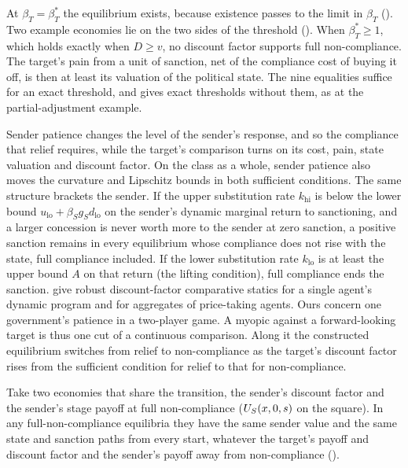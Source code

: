  At
$\beta_T=\beta_T^*$ the equilibrium exists,
because existence passes to the limit in $\beta_T$
(). Two example economies lie on the two sides
of the threshold (). When
$\beta_T^*\ge1$, which holds exactly when $D\ge v$, no discount factor
supports full non-compliance. The target's pain from a unit of sanction, net of the
compliance cost of buying it off, is then at least its valuation of the political
state. The nine
equalities suffice for an exact threshold, and 
gives exact thresholds without them, as at the partial-adjustment example.

 Sender patience changes the level of the sender's response, and so
the compliance that relief requires, while the target's comparison turns on its
cost, pain, state valuation and discount factor.
On the class as a whole, sender patience also moves the curvature and Lipschitz
bounds in both sufficient conditions. The same structure brackets the sender. If the
upper substitution rate $k_{\mathrm{hi}}$ is below the lower bound
$u_{\mathrm{lo}}+\beta_Sg_Sd_{\mathrm{lo}}$ on the sender's dynamic marginal
return to sanctioning, and a larger concession is never worth more to the sender
at zero sanction, a positive sanction remains in every equilibrium whose
compliance does not rise with the state, full compliance included. If the lower
substitution rate $k_{\mathrm{lo}}$ is at least the upper bound $A$ on that return
(the lifting condition), full compliance ends the sanction.
\citet[Lemma~2, Proposition~1]{AcemogluJensen2015} give robust discount-factor
comparative statics for a single agent's dynamic program and for aggregates of
price-taking agents. Ours concern one government's patience in a two-player
game. A myopic against a forward-looking target is thus one cut of a continuous
comparison. Along it the constructed equilibrium switches from relief to
non-compliance as the target's discount factor rises from the sufficient condition
for relief to that for non-compliance. 

 Take two
economies that share the transition, the sender's discount factor and the
sender's stage payoff at full non-compliance ($U_S(x,0,s)$ on the square). In any full-non-compliance equilibria they have the same sender value
and the same state and sanction paths from every start, whatever the target's
payoff and discount factor and the sender's payoff away from non-compliance
().

